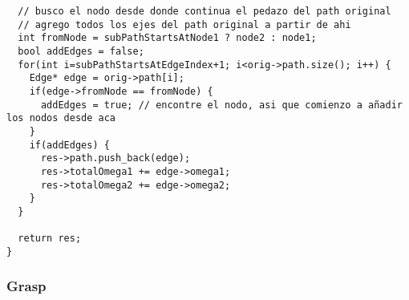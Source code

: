 \begin{verbatim}
  // busco el nodo desde donde continua el pedazo del path original
  // agrego todos los ejes del path original a partir de ahi
  int fromNode = subPathStartsAtNode1 ? node2 : node1;
  bool addEdges = false;
  for(int i=subPathStartsAtEdgeIndex+1; i<orig->path.size(); i++) {
    Edge* edge = orig->path[i];
    if(edge->fromNode == fromNode) {
      addEdges = true; // encontre el nodo, asi que comienzo a añadir los nodos desde aca
    }
    if(addEdges) {
      res->path.push_back(edge);
      res->totalOmega1 += edge->omega1;
      res->totalOmega2 += edge->omega2;
    }
  }

  return res;
}

\end{verbatim}
\normalsize

\subsubsection{Grasp}

